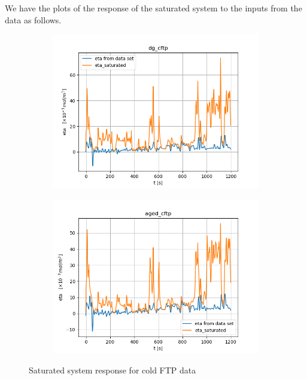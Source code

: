 We have the plots of the response of the saturated system to the inputs from the data as follows.

\begin{figure}[H]
        \begin{minipage}{0.49\textwidth}
                \begin{figure}[H]
                        \centering
                        \includegraphics[width=\textwidth]{./figs/14_figs/bounded_eta_plots/eta_bounds_dg_cftp.png}
                \end{figure}
        \end{minipage}
        \begin{minipage}{0.49\textwidth}
                \begin{figure}[H]
                        \centering
                        \includegraphics[width=\textwidth]{./figs/14_figs/bounded_eta_plots/eta_bounds_aged_cftp.png}
                \end{figure}
        \end{minipage}
        \caption{Saturated system response for cold FTP data}
\end{figure}

